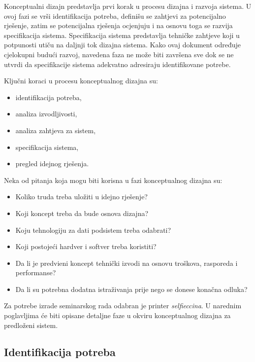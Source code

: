 \documentclass[12pt]{article}
\begin{document}
Konceptualni dizajn predstavlja prvi korak u procesu dizajna i razvoja sistema. U ovoj fazi se vrši identifikacija potreba, definišu se zahtjevi za potencijalno rješenje, zatim se potencijalna rješenja ocjenjuju i na osnovu toga se razvija specifikacija sistema. Specifikacija sistema predstavlja tehničke zahtjeve koji u potpunosti utiču na daljnji tok dizajna sistema. Kako ovaj dokument određuje cjelokupni budući razvoj, navedena faza ne može biti završena sve dok se ne utvrdi da specifikacije sistema adekvatno adresiraju identifikovane potrebe.

Klju\v{c}ni koraci u procesu konceptualnog dizajna su:
\begin{itemize}
\item identifikacija potreba,
\item analiza izvodljivosti,
\item analiza zahtjeva za sistem,
\item specifikacija sistema,
\item pregled idejnog rje\v{s}enja. %
\end{itemize}

Neka od pitanja koja mogu biti korisna u fazi konceptualnog dizajna su:
\begin{itemize}
\item Koliko truda treba ulo\v{z}iti u idejno rje\v{s}enje?
\item Koji koncept treba da bude osnova dizajna? 
\item Koju tehnologiju za dati podsistem treba odabrati?
\item Koji postoje\'ci hardver i softver treba koristiti?
\item Da li je predvi\dj eni koncept tehni\v{c}ki izvodi na osnovu tro\v{s}kova, rasporeda i performanse?
\item Da li su potrebna dodatna istra\v{z}ivanja prije nego se donese kona\v{c}na odluka? %
\end{itemize}

Za potrebe izrade seminarskog rada odabran je printer \textit{selfieccina}. U narednim poglavljima će biti opisane detaljne faze u okviru konceptualnog dizajna za predloženi sistem.

\newpage

\subsection{Identifikacija potreba}
\end{document}
